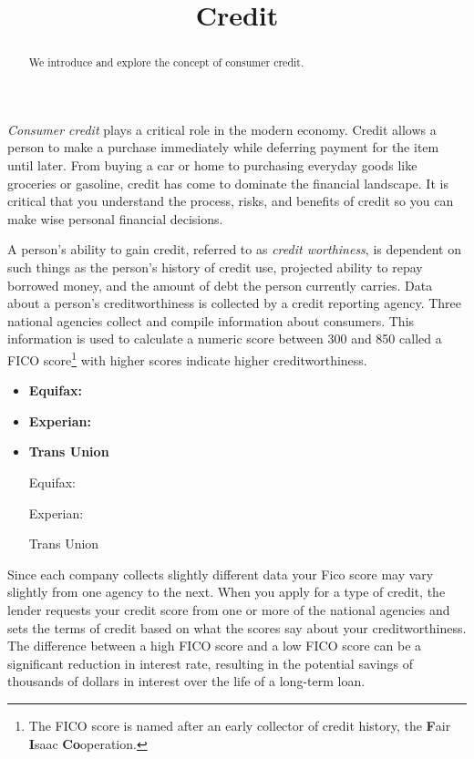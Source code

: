 \documentclass{ximera}
\title{Credit}
\begin{document}
\begin{abstract}
We introduce and explore the concept of consumer credit.
\end{abstract}

\maketitle

\emph{Consumer credit} plays a critical role in the modern economy. Credit allows a person to make a purchase immediately while deferring payment for the item until later. From buying a car or home to purchasing everyday goods like groceries or gasoline, credit has come to dominate the financial landscape. It is critical that you understand the process, risks, and benefits of credit so you can make wise personal financial decisions.

A person's ability to gain credit, referred to as \emph{credit worthiness}, is dependent on such things as the person's history of credit use, projected ability to repay borrowed money, and the amount of debt the person currently carries. Data about a person's creditworthiness is collected by a credit reporting agency. Three national agencies collect and compile information about consumers. This information is used to calculate a numeric score between 300 and 850 called a FICO score\footnote{The FICO score is named after an early collector of credit history, the \textbf{F}air \textbf{I}saac \textbf{Co}operation.} with higher scores indicate higher creditworthiness.
\begin{itemize}
\item\textbf{Equifax:} 
\item\textbf{Experian:} 
\item\textbf{Trans Union} 
\end{itemize}

\begin{itemize}
\item[Equifax:] 
\item[Experian:] 
\item[Trans Union] 
\end{itemize}

Since each company collects slightly different data your Fico score may vary slightly from one agency to the next.  When you apply for a type of credit, the lender requests your credit score from one or more of the national agencies and sets the terms of credit based on what the scores say about your creditworthiness. The difference between a high FICO score and a low FICO score can be a significant reduction in interest rate, resulting in the potential savings of thousands of dollars in interest over the life of a long-term loan.
\end{document}
